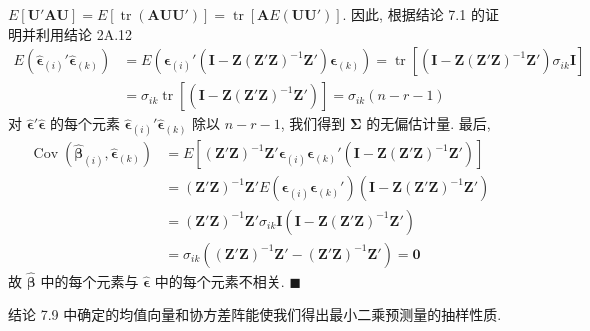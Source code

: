
$E[\mathbf{U}'\mathbf{A}\mathbf{U}]=E[\operatorname{tr}(\mathbf{A}\mathbf{U}\mathbf{U}')]=\operatorname{tr}[\mathbf{A}E(\mathbf{U}\mathbf{U}')]$. 因此, 根据结论 7.1 的证明并利用结论 2A.12
\[
\begin{aligned}
E(\hat{\boldsymbol{\epsilon}}_{(i)}'\hat{\boldsymbol{\epsilon}}_{(k)})
&=E\left(\boldsymbol{\epsilon}_{(i)}'(\mathbf{I}-\mathbf{Z}(\mathbf{Z}'\mathbf{Z})^{-1}\mathbf{Z}')\boldsymbol{\epsilon}_{(k)}\right)
=\operatorname{tr}\left[(\mathbf{I}-\mathbf{Z}(\mathbf{Z}'\mathbf{Z})^{-1}\mathbf{Z}')\sigma_{ik}\mathbf{I}\right]\\
&=\sigma_{ik}\operatorname{tr}\left[(\mathbf{I}-\mathbf{Z}(\mathbf{Z}'\mathbf{Z})^{-1}\mathbf{Z}')\right]=\sigma_{ik}(n-r-1)
\end{aligned}
\]
对 $\hat{\boldsymbol{\epsilon}}'\hat{\boldsymbol{\epsilon}}$ 的每个元素 $\hat{\boldsymbol{\epsilon}}_{(i)}'\hat{\boldsymbol{\epsilon}}_{(k)}$ 除以 $n-r-1$, 我们得到 $\boldsymbol{\Sigma}$ 的无偏估计量. 最后,
\[
\begin{aligned}
\operatorname{Cov}(\hat{\boldsymbol{\beta}}_{(i)},\hat{\boldsymbol{\epsilon}}_{(k)})
&=E\left[(\mathbf{Z}'\mathbf{Z})^{-1}\mathbf{Z}'\boldsymbol{\epsilon}_{(i)}\boldsymbol{\epsilon}_{(k)}'(\mathbf{I}-\mathbf{Z}(\mathbf{Z}'\mathbf{Z})^{-1}\mathbf{Z}')\right]\\
&=(\mathbf{Z}'\mathbf{Z})^{-1}\mathbf{Z}'E(\boldsymbol{\epsilon}_{(i)}\boldsymbol{\epsilon}_{(k)}')(\mathbf{I}-\mathbf{Z}(\mathbf{Z}'\mathbf{Z})^{-1}\mathbf{Z}')\\
&=(\mathbf{Z}'\mathbf{Z})^{-1}\mathbf{Z}'\sigma_{ik}\mathbf{I}(\mathbf{I}-\mathbf{Z}(\mathbf{Z}'\mathbf{Z})^{-1}\mathbf{Z}')\\
&=\sigma_{ik}\left((\mathbf{Z}'\mathbf{Z})^{-1}\mathbf{Z}'-(\mathbf{Z}'\mathbf{Z})^{-1}\mathbf{Z}'\right)=\mathbf{0}
\end{aligned}
\]
故 $\hat{\boldsymbol{\beta}}$ 中的每个元素与 $\hat{\boldsymbol{\epsilon}}$ 中的每个元素不相关. \hfill$\blacksquare$

结论 7.9 中确定的均值向量和协方差阵能使我们得出最小二乘预测量的抽样性质.


